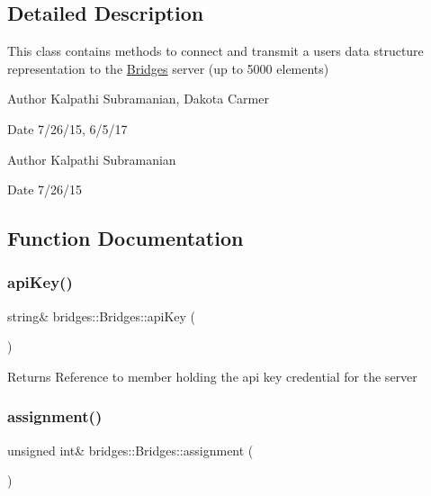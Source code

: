 \subsection{Detailed Description}
This class contains methods to connect and transmit a user\textquotesingle{}s data structure representation to the \mbox{\hyperlink{namespacebridges_1_1_bridges}{Bridges}} server (up to 5000 elements) 

\begin{DoxyAuthor}{Author}
Kalpathi Subramanian, Dakota Carmer 
\end{DoxyAuthor}
\begin{DoxyDate}{Date}
7/26/15, 6/5/17
\end{DoxyDate}
\begin{DoxyAuthor}{Author}
Kalpathi Subramanian 
\end{DoxyAuthor}
\begin{DoxyDate}{Date}
7/26/15 
\end{DoxyDate}


\subsection{Function Documentation}
\mbox{\label{namespacebridges_1_1_bridges_a4ec319d8c731624bd1aa0efa2427044e}} 
\subsubsection{\texorpdfstring{api\+Key()}{apiKey()}}
{\footnotesize\ttfamily string\& bridges\+::\+Bridges\+::api\+Key (\begin{DoxyParamCaption}{ }\end{DoxyParamCaption})}

\begin{DoxyReturn}{Returns}
Reference to member holding the api key credential for the server 
\end{DoxyReturn}
\mbox{\label{namespacebridges_1_1_bridges_a97d6cfdc40ecead5d802ac2054933038}} 
\subsubsection{\texorpdfstring{assignment()}{assignment()}}
{\footnotesize\ttfamily unsigned int\& bridges\+::\+Bridges\+::assignment (\begin{DoxyParamCaption}{ }\end{DoxyParamCaption})}

